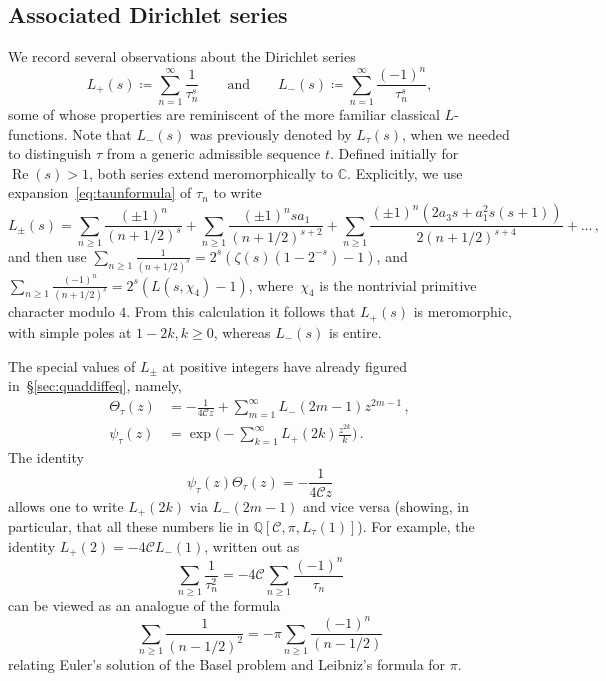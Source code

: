 \documentclass[12pt]{amsart}
\theoremstyle{plain}
\numberwithin{equation}{section}
\theoremstyle{definition}
\newcommand{\Q}{\mathbb{Q}}
\newcommand{\C}{\mathbb{C}}
\newcommand{\re}{\operatorname{Re}}
\newcommand{\Cone}{\mathscr{C}}
\begin{document}
\subsection{Associated Dirichlet series}
We record several observations about the Dirichlet series
	\[L_{+}(s) \coloneqq \sum_{n=1}^{\infty}\frac{1}{\tau_n^s}\qquad\mbox{and}\qquad L_{-}(s) \coloneqq \sum_{n=1}^{\infty}\frac{(-1)^n}{\tau_n^s},\]
some of whose properties are reminiscent of the more familiar classical $L$-functions.
Note that $L_{-}(s)$ was previously denoted by $L_{\tau}(s)$, when we needed to distinguish $\tau$ from a generic admissible sequence $t$. 
Defined initially for $\re(s) > 1$, both series extend meromorphically to $\C$. Explicitly, we use expansion~\eqref{eq:taunformula} of $\tau_n$ to write
	\[
	L_{\pm}(s) =
	\sum_{n\ge1}\frac{(\pm1)^n}{(n+1/2)^s}+\sum_{n\ge1}\frac{(\pm1)^nsa_1}{(n+1/2)^{s+2}}
	+\sum_{n\ge1}\frac{(\pm1)^n(2a_3s+a_1^2s(s+1))}{2(n+1/2)^{s+4}}+\dots\,,
	\]
and then use $\sum_{n\ge 1}\frac{1}{(n+1/2)^{s}} =
2^s(\zeta(s)(1-2^{-s})-1)$, and $\sum_{n\ge1}\frac{(-1)^n}{(n+1/2)^{s}} = 2^s(L(s,\chi_{4})-1)$, where~$\chi_4$ is the nontrivial primitive character modulo $4$. From this calculation it follows that $L_{+}(s)$ is meromorphic, with simple poles at $1-2k, k\ge0$, whereas $L_{-}(s)$ is entire. 

The special values of $L_{\pm}$ at positive integers have already figured in~\S\ref{sec:quaddiffeq}, namely,
	\begin{align*} 
	\Theta_{\tau}(z) &=-\frac{1}{4\Cone z}+\sum_{m=1}^\infty L_{-}(2m-1) z^{2m-1}\,,\\
	\psi_{\tau}(z) &= \exp\Big(-\sum_{k=1}^{\infty} L_{+}(2k)\frac{z^{2k}}{k}\Big)\,.
	\end{align*}
The identity
	\[\psi_\tau(z) \Theta_\tau(z)=-\frac{1}{4\Cone z}\]
allows one to write $L_{+}(2k)$ via $L_{-}(2m-1)$ and vice versa (showing, in particular, that all these numbers lie in $\Q[\Cone,\pi, L_{\tau}(1)]$). For example, the identity $L_{+}(2) = -4\Cone L_{-}(1)$, written out as
	\[\sum_{n\ge1}\frac{1}{\tau_n^2} = -4\Cone \sum_{n\ge1}\frac{(-1)^n}{\tau_n}\]
can be viewed as an analogue of the formula 
	\[\sum_{n\ge1}\frac{1}{(n-1/2)^2}=-\pi \sum_{n\ge1} \frac{(-1)^n}{(n-1/2)}\] 
relating Euler's solution of the Basel problem and Leibniz's formula for $\pi$.
\end{document}
